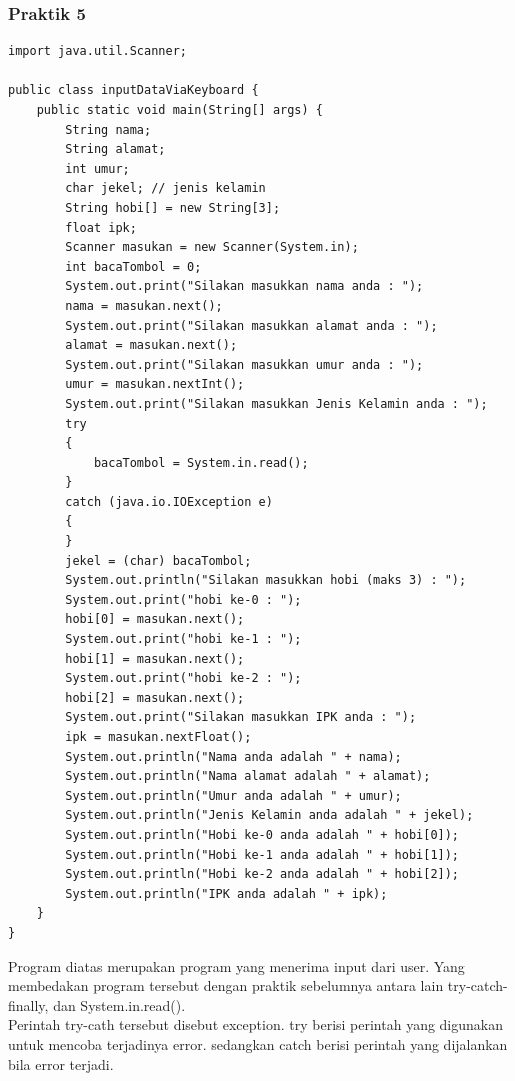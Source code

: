 \documentclass[a4paper,12pt]{article}
\begin{document}
\subsubsection{Praktik 5}
\begin{lstlisting}
import java.util.Scanner;

public class inputDataViaKeyboard {
    public static void main(String[] args) {
        String nama;
        String alamat;
        int umur;
        char jekel; // jenis kelamin
        String hobi[] = new String[3];
        float ipk;
        Scanner masukan = new Scanner(System.in);
        int bacaTombol = 0;
        System.out.print("Silakan masukkan nama anda : ");
        nama = masukan.next();
        System.out.print("Silakan masukkan alamat anda : ");
        alamat = masukan.next();
        System.out.print("Silakan masukkan umur anda : ");
        umur = masukan.nextInt();
        System.out.print("Silakan masukkan Jenis Kelamin anda : ");
        try
        {
            bacaTombol = System.in.read();
        }
        catch (java.io.IOException e)
        {
        }
        jekel = (char) bacaTombol;
        System.out.println("Silakan masukkan hobi (maks 3) : ");
        System.out.print("hobi ke-0 : ");
        hobi[0] = masukan.next();
        System.out.print("hobi ke-1 : ");
        hobi[1] = masukan.next();
        System.out.print("hobi ke-2 : ");
        hobi[2] = masukan.next();
        System.out.print("Silakan masukkan IPK anda : ");
        ipk = masukan.nextFloat();
        System.out.println("Nama anda adalah " + nama);
        System.out.println("Nama alamat adalah " + alamat);
        System.out.println("Umur anda adalah " + umur);
        System.out.println("Jenis Kelamin anda adalah " + jekel);
        System.out.println("Hobi ke-0 anda adalah " + hobi[0]);
        System.out.println("Hobi ke-1 anda adalah " + hobi[1]);
        System.out.println("Hobi ke-2 anda adalah " + hobi[2]);
        System.out.println("IPK anda adalah " + ipk);
    }
}
\end{lstlisting}

Program diatas merupakan program yang menerima input dari user.
Yang membedakan program tersebut dengan praktik sebelumnya
antara lain try-catch-finally, dan System.in.read().\\

Perintah try-cath tersebut disebut exception.
try berisi perintah yang digunakan untuk mencoba
terjadinya error.
sedangkan catch berisi perintah yang dijalankan bila error terjadi.\\
\end{document}
